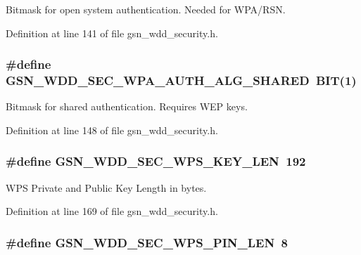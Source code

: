 Bitmask for open system authentication. Needed for WPA/RSN. 



Definition at line 141 of file gsn\_\-wdd\_\-security.h.

\hypertarget{a00604_a699d18cd8487ece2da4aa073f60ab6af}{
\subsubsection[{GSN\_\-WDD\_\-SEC\_\-WPA\_\-AUTH\_\-ALG\_\-SHARED}]{\setlength{\rightskip}{0pt plus 5cm}\#define GSN\_\-WDD\_\-SEC\_\-WPA\_\-AUTH\_\-ALG\_\-SHARED~BIT(1)}}
\label{a00604_a699d18cd8487ece2da4aa073f60ab6af}


Bitmask for shared authentication. Requires WEP keys. 



Definition at line 148 of file gsn\_\-wdd\_\-security.h.

\hypertarget{a00604_ab538c64b36b514b7b60ca80f37a5b9f0}{
\subsubsection[{GSN\_\-WDD\_\-SEC\_\-WPS\_\-KEY\_\-LEN}]{\setlength{\rightskip}{0pt plus 5cm}\#define GSN\_\-WDD\_\-SEC\_\-WPS\_\-KEY\_\-LEN~192}}
\label{a00604_ab538c64b36b514b7b60ca80f37a5b9f0}


WPS Private and Public Key Length in bytes. 



Definition at line 169 of file gsn\_\-wdd\_\-security.h.

\hypertarget{a00604_a0543ca4fa6aef9e51599f017617e33f7}{
\subsubsection[{GSN\_\-WDD\_\-SEC\_\-WPS\_\-PIN\_\-LEN}]{\setlength{\rightskip}{0pt plus 5cm}\#define GSN\_\-WDD\_\-SEC\_\-WPS\_\-PIN\_\-LEN~8}}
\label{a00604_a0543ca4fa6aef9e51599f017617e33f7}


